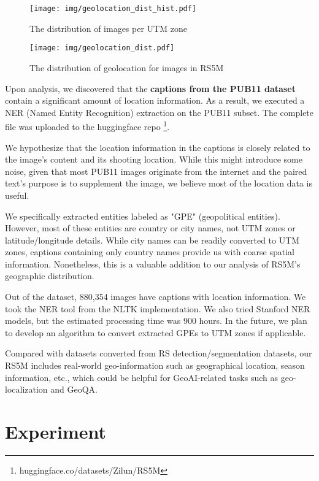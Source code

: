 \documentclass[journal]{IEEEtran}
\begin{document}
\begin{figure}
    \centering
    \texttt{[image: img/geolocation\_dist\_hist.pdf]}
    \caption{The distribution of images per UTM zone}
    \label{fig:geolocation_dist_hist}
\end{figure}


\begin{figure}
    \centering
    \texttt{[image: img/geolocation\_dist.pdf]}
    \caption{The distribution of geolocation for images in RS5M}
    \label{fig:geolocation_dist}
\end{figure}


Upon analysis, we discovered that the \textbf{captions from the PUB11 dataset} contain a significant amount of location information. As a result, we executed a NER (Named Entity Recognition) extraction on the PUB11 subset. The complete file was uploaded to the huggingface repo \footnote{huggingface.co/datasets/Zilun/RS5M}. 


We hypothesize that the location information in the captions is closely related to the image's content and its shooting location. While this might introduce some noise, given that most PUB11 images originate from the internet and the paired text's purpose is to supplement the image, we believe most of the location data is useful.

We specifically extracted entities labeled as "GPE" (geopolitical entities). However, most of these entities are country or city names, not UTM zones or latitude/longitude details. While city names can be readily converted to UTM zones, captions containing only country names provide us with coarse spatial information. Nonetheless, this is a valuable addition to our analysis of RS5M's geographic distribution.

Out of the dataset, 880,354 images have captions with location information. We took the NER tool from the NLTK implementation. We also tried Stanford NER models, but the estimated processing time was 900 hours. In the future, we plan to develop an algorithm to convert extracted GPEs to UTM zones if applicable.

Compared with datasets converted from RS detection/segmentation datasets, our RS5M includes real-world geo-information such as geographical location, season information, etc., which could be helpful for GeoAI-related tasks such as geo-localization and GeoQA. 

\section{Experiment}
\end{document}
